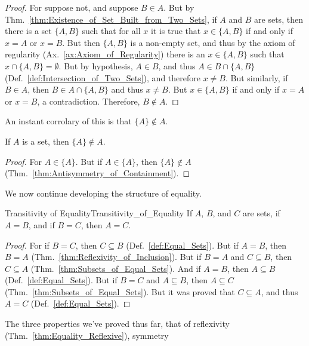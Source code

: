         \begin{proof}
            For suppose not, and suppose $B\in{A}$. But by
            Thm.~\ref{thm:Existence_of_Set_Built_from_Two_Sets}, if $A$ and $B$
            are sets, then there is a set $\{A,B\}$ such that for all $x$ it is
            true that $x\in\{A,B\}$ if and only if $x=A$ or $x=B$. But then
            $\{A,B\}$ is a non-empty set, and thus by the axiom of regularity
            (Ax.~\ref{ax:Axiom_of_Regularity}) there is an $x\in\{A,B\}$ such
            that $x\cap\{A,B\}=\emptyset$. But by hypothesis, $A\in{B}$, and
            thus $A\in{B}\cap\{A,B\}$ (Def.~\ref{def:Intersection_of_Two_Sets}),
            and therefore $x\ne{B}$. But similarly, if $B\in{A}$, then
            $B\in{A}\cap\{A,B\}$ and thus $x\ne{B}$. But $x\in\{A,B\}$ if and
            only if $x=A$ or $x=B$, a contradiction. Therefore, $B\notin{A}$.
        \end{proof}
        An instant corrolary of this is that $\{A\}\notin{A}$.
        \begin{theorem}
            \label{thm:Set_Containing_A_is_not_Element_of_A}%
            If $A$ is a set, then $\{A\}\notin{A}$.
        \end{theorem}
        \begin{proof}
            For $A\in\{A\}$. But if $A\in\{A\}$, then $\{A\}\notin{A}$
            (Thm.~\ref{thm:Antisymmetry_of_Containment}).
        \end{proof}
        We now continue developing the structure of equality.
        \begin{ltheorem}{Transitivity of Equality}{Transitivity_of_Equality}
            If $A$, $B$, and $C$ are sets, if $A=B$, and if $B=C$, then $A=C$.
        \end{ltheorem}
        \begin{proof}
            For if $B=C$, then $C\subseteq{B}$ (Def.~\ref{def:Equal_Sets}). But
            if $A=B$, then $B=A$ (Thm.~\ref{thm:Reflexivity_of_Inclusion}). But
            if $B=A$ and $C\subseteq{B}$, then $C\subseteq{A}$
            (Thm.~\ref{thm:Subsets_of_Equal_Sets}). And if $A=B$, then
            $A\subseteq{B}$ (Def.~\ref{def:Equal_Sets}). But if $B=C$ and
            $A\subseteq{B}$, then $A\subseteq{C}$
            (Thm.~\ref{thm:Subsets_of_Equal_Sets}). But it was proved that
            $C\subseteq{A}$, and thus $A=C$ (Def.~\ref{def:Equal_Sets}).
        \end{proof}
        The three properties we've proved thus far, that of reflexivity
        (Thm.~\ref{thm:Equality_Reflexive}), symmetry
